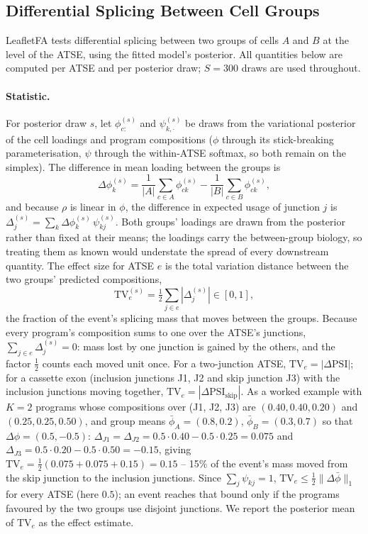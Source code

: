 \subsection*{Differential Splicing Between Cell Groups}
\label{sec:DS_group}
LeafletFA tests differential splicing between two groups of cells $A$ and $B$ at the level of the ATSE, using the fitted model's posterior. All quantities below are computed per ATSE and per posterior draw; $S = 300$ draws are used throughout.

\paragraph{Statistic.} For posterior draw $s$, let $\phi^{(s)}_{c:}$ and $\psi^{(s)}_{k,\cdot}$ be draws from the variational posterior of the cell loadings and program compositions ($\phi$ through its stick-breaking parameterisation, $\psi$ through the within-ATSE softmax, so both remain on the simplex). The difference in mean loading between the groups is
\begin{equation}
    \Delta\phi^{(s)}_k = \frac{1}{|A|}\sum_{c\in A}\phi^{(s)}_{ck} - \frac{1}{|B|}\sum_{c\in B}\phi^{(s)}_{ck},
\end{equation}
and because $\rho$ is linear in $\phi$, the difference in expected usage of junction $j$ is $\Delta_j^{(s)} = \sum_k \Delta\phi^{(s)}_k\,\psi^{(s)}_{kj}$. Both groups' loadings are drawn from the posterior rather than fixed at their means; the loadings carry the between-group biology, so treating them as known would understate the spread of every downstream quantity. The effect size for ATSE $e$ is the total variation distance between the two groups' predicted compositions,
\begin{equation}
    \mathrm{TV}^{(s)}_e = \tfrac{1}{2}\sum_{j\in e}\left|\Delta_j^{(s)}\right| \in [0, 1],
\end{equation}
the fraction of the event's splicing mass that moves between the groups. Because every program's composition sums to one over the ATSE's junctions, $\sum_{j\in e}\Delta_j^{(s)} = 0$: mass lost by one junction is gained by the others, and the factor $\tfrac12$ counts each moved unit once. For a two-junction ATSE, $\mathrm{TV}_e = |\Delta\mathrm{PSI}|$; for a cassette exon (inclusion junctions J1, J2 and skip junction J3) with the inclusion junctions moving together, $\mathrm{TV}_e = |\Delta\mathrm{PSI}_{\mathrm{skip}}|$. As a worked example with $K=2$ programs whose compositions over (J1, J2, J3) are $(0.40, 0.40, 0.20)$ and $(0.25, 0.25, 0.50)$, and group means $\bar\phi_A = (0.8, 0.2)$, $\bar\phi_B = (0.3, 0.7)$ so that $\Delta\phi = (0.5, -0.5)$: $\Delta_{J1} = \Delta_{J2} = 0.5\cdot0.40 - 0.5\cdot0.25 = 0.075$ and $\Delta_{J3} = 0.5\cdot0.20 - 0.5\cdot0.50 = -0.15$, giving $\mathrm{TV}_e = \tfrac12(0.075 + 0.075 + 0.15) = 0.15$ -- 15\% of the event's mass moved from the skip junction to the inclusion junctions. Since $\sum_j \psi_{kj} = 1$, $\mathrm{TV}_e \le \tfrac12\|\Delta\bar\phi\|_1$ for every ATSE (here $0.5$); an event reaches that bound only if the programs favoured by the two groups use disjoint junctions. We report the posterior mean of $\mathrm{TV}_e$ as the effect estimate.

